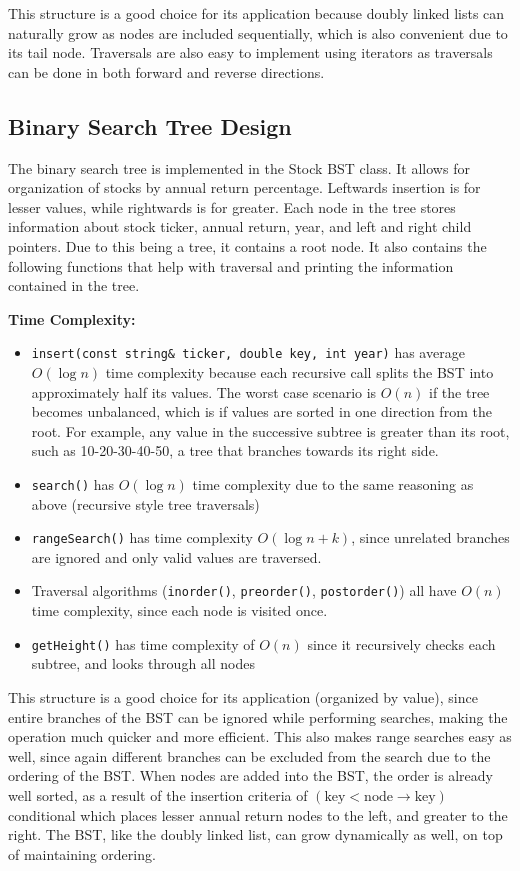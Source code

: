 \documentclass[12pt]{article}
\begin{document}
This structure is a good choice for its application because doubly linked lists can naturally grow as 
nodes are included sequentially, which is also convenient due to its tail node. 
Traversals are also easy to implement using iterators as traversals can be done in both forward and 
reverse directions. 

\subsection{Binary Search Tree Design}
The binary search tree is implemented in the Stock BST class. 
It allows for organization of stocks by annual return percentage. 
Leftwards insertion is for lesser values, while rightwards is for greater. 
Each node in the tree stores information about stock ticker, annual return, year, and left and right 
child pointers. Due to this being a tree, it contains a root node. 
It also contains the following functions that help with traversal and printing the information 
contained in the tree. 

\vspace{0.5cm}
{\large{\textbf{Time Complexity:}}}
\begin{itemize}
    \item \texttt{insert(const string\& ticker, double key, int year)} has average $O(\log n)$ time complexity because each recursive call splits the BST into approximately half its values. The worst case scenario is $O(n)$ if the tree becomes unbalanced, which is if values are sorted in one direction from the root. For example, any value in the successive subtree is greater than its root, such as 10-20-30-40-50, a tree that branches towards its right side. 
    \item \texttt{search()} has $O(\log n)$ time complexity due to the same reasoning as above (recursive style tree traversals)
    \item \texttt{rangeSearch()} has time complexity $O(\log n + k)$, since unrelated branches are ignored and only valid values are traversed. 
    \item Traversal algorithms (\texttt{inorder()}, \texttt{preorder()}, \texttt{postorder()}) all have $O(n)$ time complexity, since each node is visited once. 
    \item \texttt{getHeight()} has time complexity of $O(n)$ since it recursively checks each subtree, and looks through all nodes 
\end{itemize}

This structure is a good choice for its application (organized by value), since entire branches of the BST 
can be ignored while performing searches, making the operation much quicker and more efficient. 
This also makes range searches easy as well, since again different branches can be excluded from the search 
due to the ordering of the BST. When nodes are added into the BST, the order is already well sorted, as a 
result of the insertion criteria of $(\text{key} < \text{node}\rightarrow \text{key})$ conditional which places lesser annual return nodes to 
the left, and greater to the right. The BST, like the doubly linked list, can grow dynamically as well, on top 
of maintaining ordering. 
\end{document}
